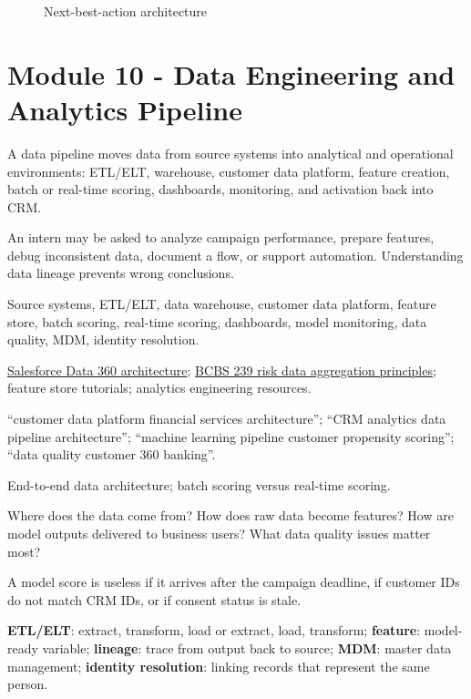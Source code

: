 \documentclass[
	11pt,
	fleqn,
	a4paper,
	oneside,
]{LegrandOrangeBook}
\newcommand{\moduleblock}[9]{%
	\begin{description}[leftmargin=3.4cm, style=nextline, font=\sffamily\bfseries]
		\item[What it is] #1
		\item[Why it matters] #2
		\item[Key concepts] #3
		\item[Resources to find] #4
		\item[Search queries] #5
		\item[Diagrams] #6
		\item[Practical questions] #7
		\item[Mini case] #8
		\item[Key terms] #9
	\end{description}
}
\newcommand{\source}[2]{\href{#2}{#1}}
\newcommand{\term}[2]{\textbf{#1}: #2}
\begin{document}
\begin{figure}[H]
	\centering
	\caption{Next-best-action architecture}
\end{figure}

\section{Module 10 - Data Engineering and Analytics Pipeline}

\moduleblock
{A data pipeline moves data from source systems into analytical and operational environments: ETL/ELT, warehouse, customer data platform, feature creation, batch or real-time scoring, dashboards, monitoring, and activation back into CRM.}
{An intern may be asked to analyze campaign performance, prepare features, debug inconsistent data, document a flow, or support automation. Understanding data lineage prevents wrong conclusions.}
{Source systems, ETL/ELT, data warehouse, customer data platform, feature store, batch scoring, real-time scoring, dashboards, model monitoring, data quality, MDM, identity resolution.}
{\source{Salesforce Data 360 architecture}{https://architect.salesforce.com/docs/architect/fundamentals/guide/data-360-architecture}; \source{BCBS 239 risk data aggregation principles}{https://www.bis.org/publ/bcbs239.htm}; feature store tutorials; analytics engineering resources.}
{``customer data platform financial services architecture''; ``CRM analytics data pipeline architecture''; ``machine learning pipeline customer propensity scoring''; ``data quality customer 360 banking''.}
{End-to-end data architecture; batch scoring versus real-time scoring.}
{Where does the data come from? How does raw data become features? How are model outputs delivered to business users? What data quality issues matter most?}
{A model score is useless if it arrives after the campaign deadline, if customer IDs do not match CRM IDs, or if consent status is stale.}
{\term{ETL/ELT}{extract, transform, load or extract, load, transform}; \term{feature}{model-ready variable}; \term{lineage}{trace from output back to source}; \term{MDM}{master data management}; \term{identity resolution}{linking records that represent the same person}.}
\end{document}
